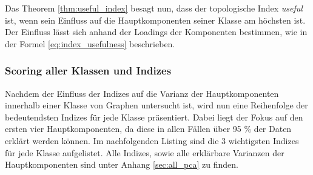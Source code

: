 Das Theorem \ref{thm:useful_index} besagt nun, dass der topologische Index \textit{useful} ist, wenn sein Einfluss auf die Hauptkomponenten seiner Klasse am höchsten ist. Der Einfluss lässt sich anhand der Loadings der Komponenten bestimmen, wie in der Formel \ref{eq:index_usefulness} beschrieben.

\subsubsection{Scoring aller Klassen und Indizes}

Nachdem der Einfluss der Indizes auf die Varianz der Hauptkomponenten innerhalb einer Klasse von Graphen untersucht ist, wird nun eine Reihenfolge der bedeutendsten Indizes für jede Klasse präsentiert.
Dabei liegt der Fokus auf den ersten vier Hauptkomponenten, da diese in allen Fällen über 95 \% der Daten erklärt werden können.
Im nachfolgenden Listing sind die 3 wichtigsten Indizes für jede Klasse aufgelistet. Alle Indizes, sowie alle erklärbare Varianzen der Hauptkomponenten sind unter Anhang \ref{sec:all_pca} zu finden.

